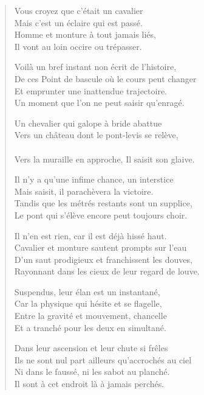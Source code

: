 \begin{verse}
Vous croyez que c’était un cavalier\\
Mais c’est un éclaire qui est passé.\\
Homme et monture à tout jamais liés,\\
Il vont au loin occire ou trépasser.

Voilà un bref instant non écrit de l’histoire,\\
De ces Point de bascule où le cours peut changer\\
Et emprunter une inattendue trajectoire.\\
Un moment que l’on ne peut saisir qu’enragé.

Un chevalier qui galope à bride abattue\\
Vers un château dont le pont-levis se relève,\\
\\
Vers la muraille en approche, Il saisit son glaive.

Il n’y a qu’une infime chance, un interstice\\
Mais saisit, il parachèvera la victoire.\\
Tandis que les métrés restants sont un supplice,\\
Le pont qui s’élève encore peut toujours choir.

Il n’en est rien, car il est déjà hissé haut.\\
Cavalier et monture sautent prompts sur l’eau\\
D’un saut prodigieux et franchissent les douves,\\
Rayonnant dans les cieux de leur regard de louve.

Suspendus, leur élan est un instantané,\\
Car la physique qui hésite et se flagelle,\\
Entre la gravité et mouvement, chancelle\\
Et a tranché pour les deux en simultané.

Dans leur ascension et leur chute si frêles\\
Ils ne sont nul part ailleurs qu’accrochés au ciel\\
Ni dans le faussé, ni les sabot au planché.\\
Il sont à cet endroit là à jamais perchés.
\end{verse}






